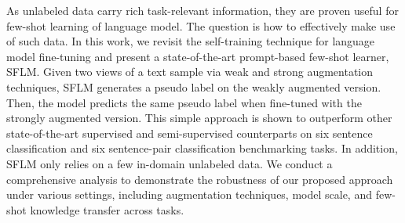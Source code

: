 As unlabeled data carry rich task-relevant information, they are proven useful for few-shot learning of language model. The question is how to effectively make use of such data. In this work, we revisit the self-training technique for language model fine-tuning and present a state-of-the-art prompt-based few-shot learner, SFLM. Given two views of a text sample via weak and strong augmentation techniques, SFLM generates a pseudo label on the weakly augmented version. Then, the model predicts the same pseudo label when fine-tuned with the strongly augmented version. This simple approach is shown to outperform other state-of-the-art supervised and semi-supervised counterparts on six sentence classification and six sentence-pair classification benchmarking tasks. In addition, SFLM only relies on a few in-domain unlabeled data. We conduct a comprehensive analysis to demonstrate the robustness of our proposed approach under various settings, including augmentation techniques, model scale, and few-shot knowledge transfer across tasks.

